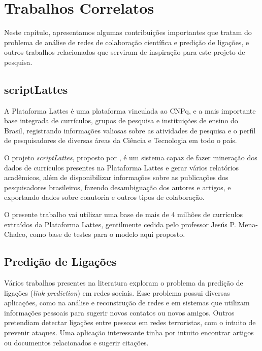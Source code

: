 \chapter{Trabalhos Correlatos}
\label{cap:correlatos}

Neste capítulo, apresentamos algumas contribuições importantes que tratam do problema de análise de redes de colaboração científica e predição de ligações, e outros trabalhos relacionados que serviram de inspiração para este projeto de pesquisa.


\section{scriptLattes}
\label{sec:scriptLattes}

A Plataforma Lattes é uma plataforma vinculada ao CNPq, e a mais importante base integrada de currículos, grupos de pesquisa e instituições de ensino do Brasil, registrando informações valiosas sobre as atividades de pesquisa e o perfil de pesquisadores de diversas áreas da Ciência e Tecnologia em todo o país.

O projeto \textit{scriptLattes}, proposto por \citet{Mena-Chalco2009}, é um sistema capaz de fazer mineração dos dados de currículos presentes na Plataforma Lattes e gerar vários relatórios acadêmicos, além de disponibilizar informações sobre as publicações dos pesquisadores brasileiros, fazendo desambiguação dos autores e artigos, e exportando dados sobre coautoria e outros tipos de colaboração.

O presente trabalho vai utilizar uma base de mais de 4 milhões de currículos extraídos da Plataforma Lattes, gentilmente cedida pelo professor Jesús P. Mena-Chalco, como base de testes para o modelo aqui proposto.


\section{Predição de Ligações}
\label{sec:link-prediction}

Vários trabalhos presentes na literatura exploram o problema da predição de ligações (\textit{link prediction}) em redes sociais. Esse problema possui diversas aplicações, como na análise e reconstrução de redes e em sistemas que utilizam informações pessoais para sugerir novos contatos ou novos amigos. Outros pretendiam detectar ligações entre pessoas em redes terroristas, com o intuito de prevenir ataques. Uma aplicação interessante tinha por intuito encontrar artigos ou documentos relacionados e sugerir citações.

